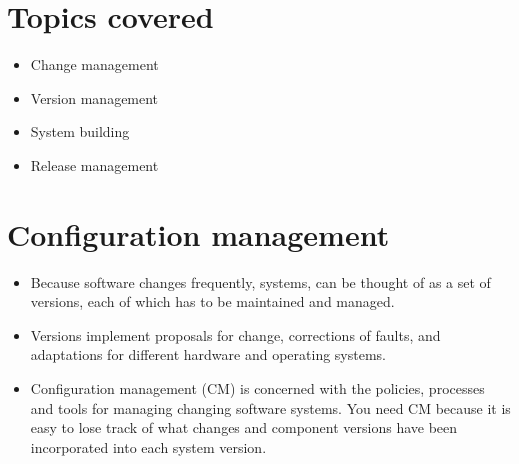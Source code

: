 
\section{Topics covered}
\begin{itemize}

\item Change management

\item Version management

\item System building

\item Release management

\end{itemize}

\section{Configuration management}
\begin{itemize}

\item Because software changes frequently, systems, can be thought of as a set of versions, each of which has to be maintained and managed.

\item Versions implement proposals for change, corrections of faults, and adaptations for different hardware and operating systems.

\item Configuration management (CM) is concerned with the policies, processes and tools for managing changing software systems. You need CM because it is easy to lose track of what changes and component versions have been incorporated into each system version.

\end{itemize}
